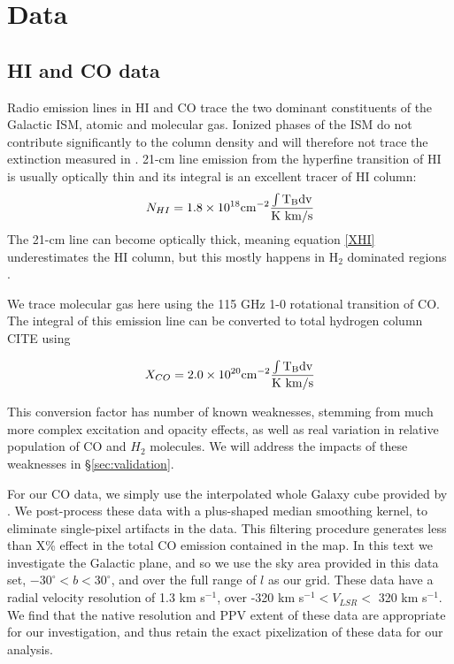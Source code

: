 \section{Data}
\label{sec:data}
\subsection{HI and CO data}

Radio emission lines in HI and CO trace the two dominant constituents of the Galactic ISM, atomic and molecular gas. Ionized phases of the ISM do not contribute significantly to the column density and will therefore not trace the extinction measured in \cite{Green_2015}. 21-cm line emission from the hyperfine transition of HI is usually optically thin and its integral is an excellent tracer of HI column:
\begin{equation}\label{XHI}
N_{HI} = 1.8 \times 10^{18} \rm cm^{-2} \frac{ \int T_B dv}{\rm K~km/s}
\end{equation}
The 21-cm line can become optically thick, meaning equation \ref{XHI} underestimates the HI column, but this mostly happens in H$_2$ dominated regions \cite{Goldsmith_2007}. 

We trace molecular gas here using the 115 GHz 1-0 rotational transition of CO. The integral of this emission line can be converted to total hydrogen column CITE using

\begin{equation}\label{XCO}
X_{CO} = 2.0 \times 10^{20} \rm cm^{-2} \frac{ \int T_B dv}{\rm K~km/s}
\end{equation}

This conversion factor has number of known weaknesses, stemming from much more complex excitation and opacity effects, as well as real variation in relative population of CO and $H_2$ molecules. We will address the impacts of these weaknesses in \S \ref{sec:validation}. 

For our CO data, we simply use the interpolated whole Galaxy cube provided by \cite{Dame_2001}. We post-process these data with a plus-shaped median smoothing kernel, to eliminate single-pixel artifacts in the data. This filtering procedure generates less than X\% effect in the total CO emission contained in the map. In this text we investigate the Galactic plane, and so we use the sky area provided in this data set, $-30^\circ < b < 30^\circ$, and over the full range of $l$ as our grid. These data have a radial velocity resolution of 1.3 km s$^{-1}$, over -320 km s$^{-1} < V_{LSR} <$ 320 km s$^{-1}$. We find that the native resolution and PPV extent of these data are appropriate for our investigation, and thus retain the exact pixelization of these data for our analysis. 

